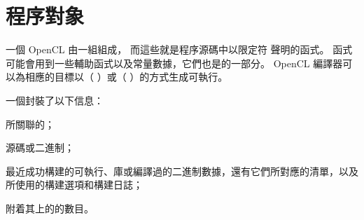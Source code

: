 \section{程序對象}

一個 OpenCL 由一組組成，
而這些就是程序源碼中以限定符  聲明的函式。
  函式可能會用到一些輔助函式以及常量數據，它們也是的一部分。
 OpenCL 編譯器可以為相應的目標以{}（ {} ）或{}（ {} ）的方式生成可執行。

一個封裝了以下信息：
\startigBase
\item 所關聯的；
\item {}源碼或二進制；
\item 最近成功構建的可執行、庫或編譯過的二進制數據，還有它們所對應的清單，以及所使用的構建選項和構建日誌；
\item 附着其上的的數目。
\stopigBase









